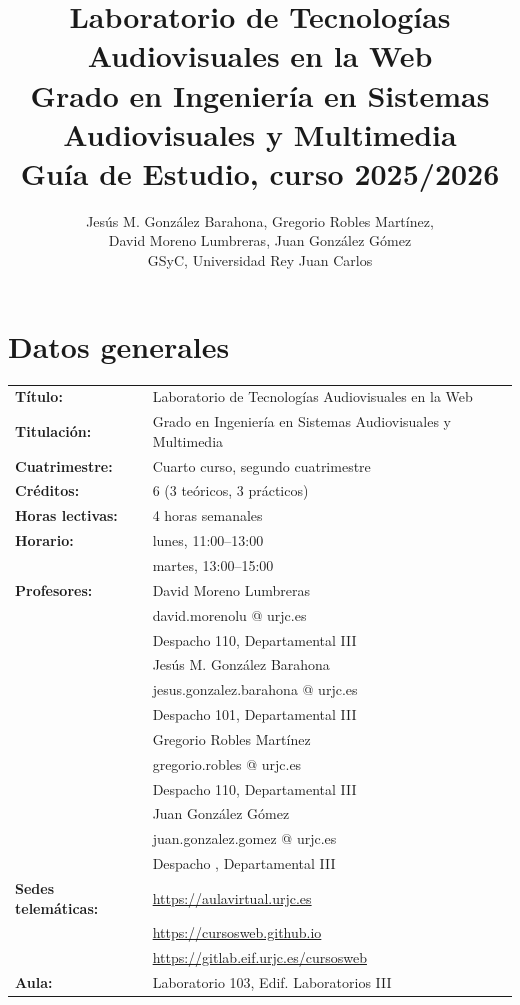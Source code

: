 \documentclass[a4paper,12pt]{article}
\title{Laboratorio de Tecnologías Audiovisuales en la Web \\
  Grado en Ingeniería en Sistemas Audiovisuales y Multimedia \\
  Guía de Estudio, curso 2025/2026}
\author{Jesús M. González Barahona, Gregorio Robles Martínez, \\
  David Moreno Lumbreras, Juan González Gómez \\
GSyC, Universidad Rey Juan Carlos}
\begin{document}
\maketitle

\tableofcontents

\newpage

\section{Datos generales}

\begin{tabular}{ll}
\textbf{Título:} & Laboratorio de Tecnologías Audiovisuales en la Web \\
\textbf{Titulación:} & Grado en Ingeniería en Sistemas Audiovisuales y Multimedia \\
\textbf{Cuatrimestre:} & Cuarto curso, segundo cuatrimestre \\
\textbf{Créditos:} & 6 (3 teóricos, 3 prácticos) \\
\textbf{Horas lectivas:} & 4 horas semanales \\
\textbf{Horario:} & lunes, 11:00--13:00 \\
                  & martes, 13:00--15:00 \\
\textbf{Profesores:}
& David Moreno Lumbreras\\
& \hspace{1cm}david.morenolu @ urjc.es \\
& \hspace{1cm}Despacho 110, Departamental III\\
& Jesús M. González Barahona \\
& \hspace{1cm}jesus.gonzalez.barahona @ urjc.es \\
& \hspace{1cm}Despacho 101, Departamental III\\
& Gregorio Robles Martínez \\
& \hspace{1cm}gregorio.robles @ urjc.es \\
& \hspace{1cm}Despacho 110, Departamental III\\
& Juan González Gómez\\
& \hspace{1cm}juan.gonzalez.gomez @ urjc.es \\
& \hspace{1cm}Despacho , Departamental III\\
\textbf{Sedes telemáticas:} & \url{https://aulavirtual.urjc.es} \\
                            & \url{https://cursosweb.github.io} \\
                            & \url{https://gitlab.eif.urjc.es/cursosweb} \\
\textbf{Aula:} & Laboratorio 103, Edif. Laboratorios III \\
\end{tabular}
\end{document}
